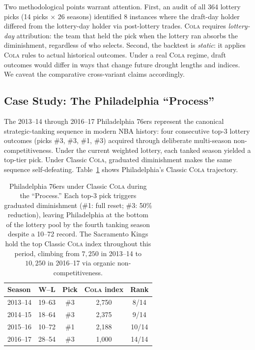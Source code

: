 \documentclass{article}
\newcommand{\cola}{\textup{\textsc{Cola}}}
\begin{document}
Two methodological points warrant attention. First, an audit of all 364 lottery picks (14 picks $\times$ 26 seasons) identified 8 instances where the draft-day holder differed from the lottery-day holder via post-lottery trades. \cola{} requires \emph{lottery-day} attribution: the team that held the pick when the lottery ran absorbs the diminishment, regardless of who selects. Second, the backtest is \emph{static}: it applies \cola{} rules to actual historical outcomes. Under a real \cola{} regime, draft outcomes would differ in ways that change future drought lengths and indices. We caveat the comparative cross-variant claims accordingly.

\subsection{Case Study: The Philadelphia ``Process''}

The 2013--14 through 2016--17 Philadelphia 76ers represent the canonical strategic-tanking sequence in modern NBA history: four consecutive top-3 lottery outcomes (picks \#3, \#3, \#1, \#3) acquired through deliberate multi-season non-competitiveness. Under the current weighted lottery, each tanked season yielded a top-tier pick. Under Classic \cola{}, graduated diminishment makes the same sequence self-defeating. Table~\ref{tab:phi} shows Philadelphia's Classic \cola{} trajectory.

\begin{table}[t]
\centering
\small
\begin{tabular}{lcccc}
\toprule
Season & W--L & Pick & \cola{} index & Rank \\
\midrule
2013--14 & 19--63 & \#3 & 2{,}750 & 8/14 \\
2014--15 & 18--64 & \#3 & 2{,}375 & 9/14 \\
2015--16 & 10--72 & \#1 & 2{,}188 & 10/14 \\
2016--17 & 28--54 & \#3 & 1{,}000 & 14/14 \\
\bottomrule
\end{tabular}
\caption{Philadelphia 76ers under Classic \cola{} during the ``Process.'' Each top-3 pick triggers graduated diminishment (\#1: full reset; \#3: 50\% reduction), leaving Philadelphia at the bottom of the lottery pool by the fourth tanking season despite a 10--72 record. The Sacramento Kings hold the top Classic \cola{} index throughout this period, climbing from $7{,}250$ in 2013--14 to $10{,}250$ in 2016--17 via organic non-competitiveness.}
\label{tab:phi}
\end{table}
\end{document}
